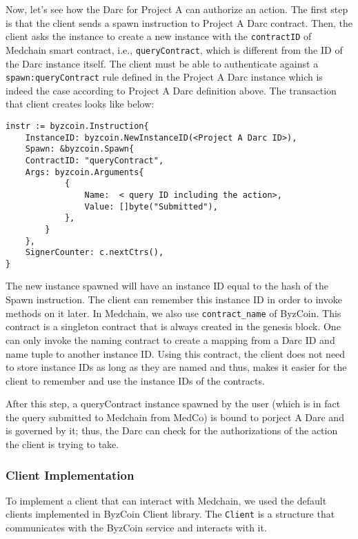 Now, let's see how the Darc for Project A can authorize an action. The first step is that the client sends a spawn instruction to Project A Darc contract. Then, the client asks the instance to create a new instance with the \texttt{contractID} of Medchain smart contract, i.e., \texttt{queryContract}, which is different from the ID of the Darc instance itself. The client must be able to authenticate against a \texttt{spawn:queryContract} rule defined in the Project A Darc instance which is indeed the case according to Project A Darc definition above. The transaction that client creates looks like below:

\begin{verbatim}
instr := byzcoin.Instruction{
    InstanceID: byzcoin.NewInstanceID(<Project A Darc ID>),
    Spawn: &byzcoin.Spawn{
    ContractID: "queryContract",
    Args: byzcoin.Arguments{
		    {
		        Name:  < query ID including the action>,
		        Value: []byte("Submitted"), 
		    },
        }  
    },
    SignerCounter: c.nextCtrs(),
}
\end{verbatim}

The new instance spawned will have an instance ID equal to the hash of the Spawn instruction. The client can remember this instance ID in order to invoke methods on it later. In Medchain, we also use \texttt{contract\_name} of ByzCoin. This contract is a singleton contract that is always created in the genesis block. One can only invoke the naming contract to create a mapping from a Darc ID and name tuple to another instance ID. Using this contract, the client does not need to store instance IDs as long as they are named and thus, makes it easier for the client to remember and use the instance IDs of the contracts.

After this step, a queryContract instance spawned by the user (which is in fact the query submitted to Medchain from MedCo) is bound to porject A Darc and is governed by it; thus, the Darc can check for the authorizations of the action the client is trying to take. 

\subsubsection{Client Implementation} \label{impl:client}
To implement a client that can interact with Medchain, we used the default clients  implemented in ByzCoin Client library. The \texttt{Client} is a structure that communicates with the ByzCoin service and interacts with it. 

